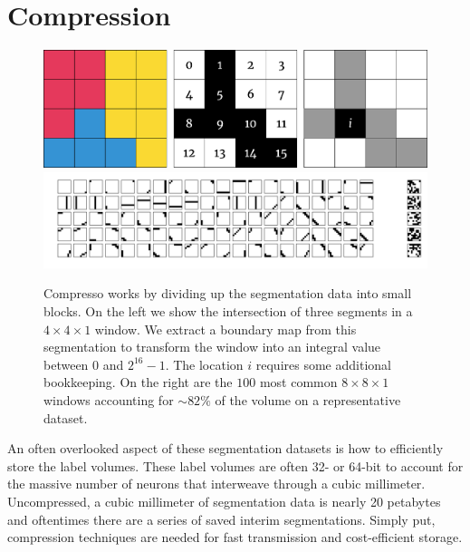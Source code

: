 \section{Compression}

\begin{figure}[t]
	\begin{center}
		\includegraphics[width=0.45\linewidth]{./figures/encoding_diagram_opt.pdf}
		\hspace{0.08\linewidth}
		\includegraphics[width=0.45\linewidth]{./figures/window_values.pdf}
	\end{center}	
	\caption{Compresso works by dividing up the segmentation data into small blocks. On the left we show the intersection of three segments in a $4\times4\times1$ window. We extract a boundary map from this segmentation to transform the window into an integral value between $0$ and $2^{16} - 1$. The location $i$ requires some additional bookkeeping. On the right are the $100$ most common $8 \times 8 \times 1$ windows accounting for $\sim82\%$ of the volume on a representative dataset.}
	\label{fig:compression}
\end{figure}

An often overlooked aspect of these segmentation datasets is how to efficiently store the label volumes.
These label volumes are often 32- or 64-bit to account for the massive number of neurons that interweave through a cubic millimeter.
Uncompressed, a cubic millimeter of segmentation data is nearly 20 petabytes and oftentimes there are a series of saved interim segmentations.
Simply put, compression techniques are needed for fast transmission and cost-efficient storage.

